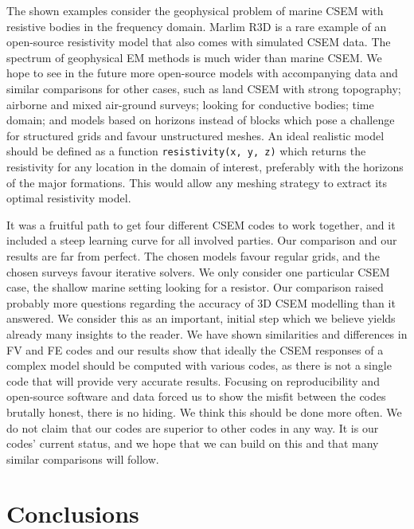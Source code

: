 \documentclass[a4paper, extra, camera,%
]{gji}
\begin{document}
The shown examples consider the geophysical problem of marine CSEM with resistive bodies in the frequency domain. Marlim R3D is a rare example of an open-source resistivity model that also comes with simulated CSEM data. The spectrum of geophysical EM methods is much wider than marine CSEM. We hope to see in the future more open-source models with accompanying data and similar comparisons for other cases, such as land CSEM with strong topography; airborne and mixed air-ground surveys; looking for conductive bodies; time domain; and models based on horizons instead of blocks which pose a challenge for structured grids and favour unstructured meshes. An ideal realistic model should be defined as a function \texttt{resistivity(x, y, z)} which returns the resistivity for any location in the domain of interest, preferably with the horizons of the major formations. This would allow any meshing strategy to extract its optimal resistivity model.

It was a fruitful path to get four different CSEM codes to work together, and it included a steep learning curve for all involved parties. Our comparison and our results are far from perfect. The chosen models favour regular grids, and the chosen surveys favour iterative solvers. We only consider one particular CSEM case, the shallow marine setting looking for a resistor. Our comparison raised probably more questions regarding the accuracy of 3D CSEM modelling than it answered. We consider this as an important, initial step which we believe yields already many insights to the reader. We have shown similarities and differences in FV and FE codes and our results show that ideally the CSEM responses of a complex model should be computed with various codes, as there is not a single code that will provide very accurate results. Focusing on reproducibility and open-source software and data forced us to show the misfit between the codes brutally honest, there is no hiding. We think this should be done more often. We do not claim that our codes are superior to other codes in any way. It is our codes' current status, and we hope that we can build on this and that many similar comparisons will follow.

\section{Conclusions}
\end{document}

